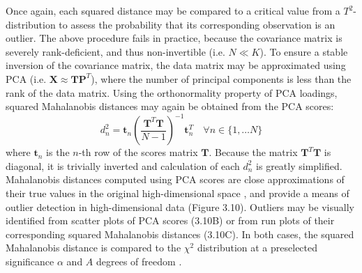 \begin{doublespace}
Once again, each squared distance may be compared to a critical value from a
$T^2$-distribution to assess the probability that its corresponding observation
is an outlier. The above procedure fails in practice, because the covariance
matrix is severely rank-deficient, and thus non-invertible (i.e. $N \ll K$).
To ensure a stable inversion of the covariance matrix, the data matrix may be
approximated using PCA (i.e. $\mathbf{X} \approx \mathbf{T} \mathbf{P}^T$),
where the number of principal components is less than the rank of the data
matrix. Using the orthonormality property of PCA loadings, squared Mahalanobis
distances may again be obtained from the PCA scores:
\begin{equation}
d_n^2 =
 \mathbf{t}_n
 \left( \frac{\mathbf{T}^T \mathbf{T}}{N - 1} \right)^{-1}
 \mathbf{t}_n^T
 \quad \forall n \in \{1, \dots N\}
\end{equation}
where $\mathbf{t}_n$ is the $n$-th row of the scores matrix $\mathbf{T}$.
Because the matrix $\mathbf{T}^T \mathbf{T}$ is diagonal, it is trivially
inverted and calculation of each $d_n^2$ is greatly simplified. Mahalanobis
distances computed using PCA scores are close approximations of their true
values in the original high-dimensional space \cite{demaesschalck:cils2000},
and provide a means of outlier detection in high-dimensional data
(Figure 3.10). Outliers may be visually identified from scatter plots of PCA
scores (3.10B) or from run plots of their corresponding squared Mahalanobis
distances (3.10C). In both cases, the squared Mahalanobis distance is compared
to the $\chi^2$ distribution at a preselected significance $\alpha$ and $A$
degrees of freedom \cite{hotelling:ams1931,worley:abio2013}.
\end{doublespace}

